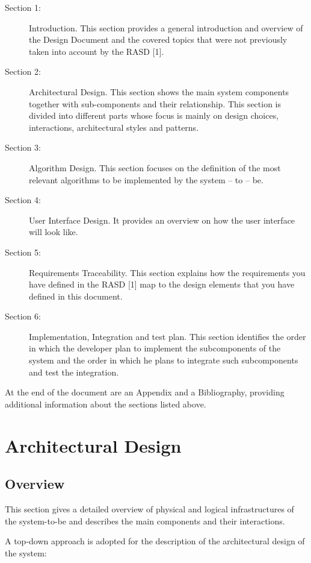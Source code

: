 \documentclass{article}
\begin{document}
	\begin{description}
	\item [Section 1:] Introduction. This section provides a general introduction and overview of the Design Document and the covered topics that were not previously taken into account by the RASD [1].
	\item [Section 2:] Architectural Design. This section shows the main system components together with sub-components and their relationship. This section is divided into different parts whose focus is mainly on design choices, interactions, architectural styles and patterns.
	\item [Section 3:] Algorithm Design. This section focuses on the definition of the most relevant algorithms to be implemented by the system – to – be.
	\item [Section 4:] User Interface Design. It provides an overview on how the user interface will look like.
	\item [Section 5:] Requirements Traceability. This section explains how the requirements you have defined in the RASD [1] map to the design elements that you have defined in this document.
	\item [Section 6:] Implementation, Integration and test plan. This section identifies the order in which the developer plan to implement the subcomponents of the system and the order in which he plans to integrate such subcomponents and test the integration.
	\end{description}

	\bigskip
	At the end of the document are an Appendix and a Bibliography, providing additional information about the sections listed above.

	\section{Architectural Design}


	\subsection{Overview}

	This section gives a detailed overview of physical and logical infrastructures of the system-to-be and describes the main components and their interactions.

	A top-down approach is adopted for the description of the architectural design of the system:
\end{document}
